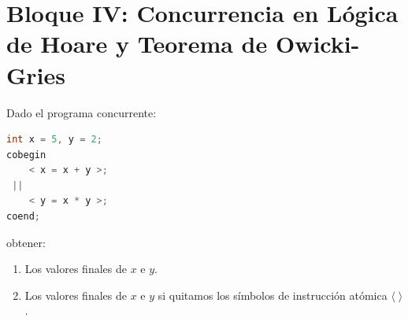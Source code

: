 \section{Bloque IV: Concurrencia en Lógica de Hoare y Teorema de Owicki-Gries}

\begin{ejercicio}
Dado el programa concurrente:
\begin{lstlisting}[language=C++]
int x = 5, y = 2;
cobegin
    < x = x + y >;
 ||
    < y = x * y >;
coend;
\end{lstlisting}
obtener:
\begin{enumerate}[label=(\alph*),leftmargin=*]
    \item Los valores finales de $x$ e $y$.
    \item Los valores finales de $x$ e $y$ si quitamos los símbolos de instrucción atómica $\langle \; \rangle$.
\end{enumerate}
\end{ejercicio}


